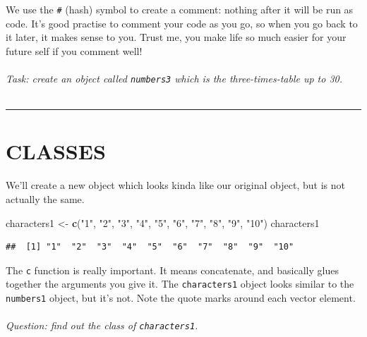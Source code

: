 \documentclass[
]{book}
\newenvironment{Shaded}{\begin{snugshade}}{\end{snugshade}}
\newcommand{\KeywordTok}[1]{\textcolor[rgb]{0.13,0.29,0.53}{\textbf{#1}}}
\newcommand{\NormalTok}[1]{#1}
\newcommand{\StringTok}[1]{\textcolor[rgb]{0.31,0.60,0.02}{#1}}
\begin{document}
We use the \texttt{\#} (hash) symbol to create a comment: nothing after it will be run
as code. It's good practise to comment your code as you go, so when you
go back to it later, it makes sense to you. Trust me, you make life so much
easier for your future self if you comment well!\\
~\\

\emph{Task: create an object called \texttt{numbers3} which is the three-times-table up to
30.}\\
~\\

\begin{center}\rule{0.5\linewidth}{0.5pt}\end{center}

\hypertarget{classes}{%
\section{CLASSES}\label{classes}}

We'll create a new object which looks kinda like our original object, but is
not actually the same.

\begin{Shaded}
\begin{Highlighting}[]
\NormalTok{characters1 <-}\StringTok{ }\KeywordTok{c}\NormalTok{(}\StringTok{"1"}\NormalTok{, }\StringTok{"2"}\NormalTok{, }\StringTok{"3"}\NormalTok{, }\StringTok{"4"}\NormalTok{, }\StringTok{"5"}\NormalTok{, }\StringTok{"6"}\NormalTok{, }\StringTok{"7"}\NormalTok{, }\StringTok{"8"}\NormalTok{, }\StringTok{"9"}\NormalTok{, }\StringTok{"10"}\NormalTok{)}
\NormalTok{characters1}
\end{Highlighting}
\end{Shaded}

\begin{verbatim}
##  [1] "1"  "2"  "3"  "4"  "5"  "6"  "7"  "8"  "9"  "10"
\end{verbatim}

The \texttt{c} function is really important. It means concatenate, and basically
glues together the arguments you give it. The \texttt{characters1} object
looks similar to the \texttt{numbers1} object, but it's not. Note the quote marks
around each vector element.\\
~\\

\emph{Question: find out the class of \texttt{characters1}.}\\
~\\
\end{document}
